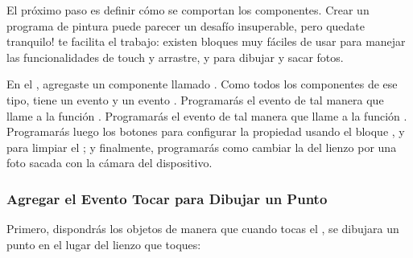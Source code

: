 El próximo paso es definir cómo se comportan los componentes. Crear un
programa de pintura puede parecer un desafío insuperable, pero quedate
tranquilo! \AppInventor te facilita el trabajo: existen bloques muy
fáciles de usar para manejar las funcionalidades de touch y arrastre,
y para dibujar y sacar fotos.

En el \designer, agregaste un componente  llamado
. Como todos los componentes de ese tipo,
 tiene un evento  y un evento
. Programarás el evento 
de tal manera que llame a la función
. Programarás el evento
 de tal manera que llame a la función
. Programarás luego los botones para
configurar la propiedad  usando el bloque
, y para limpiar el
; y finalmente, programarás como cambiar la
 del lienzo por una foto sacada con la cámara
del dispositivo.

\subsubsection*{Agregar el Evento Tocar para Dibujar un Punto}

Primero, dispondrás los objetos de manera que cuando tocas el
, se dibujara un punto en el lugar del lienzo que
toques:
	
